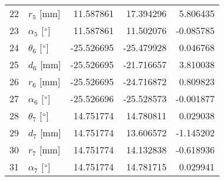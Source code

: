 \documentclass{standalone}%
\begin{document}
\begin{tabular}{llrrr}
22 &              $r_{5}$ [mm] &  11.587861 &  17.394296 &   5.806435 \\
23 &  $\alpha_{5}$ [$\degree$] &  11.587861 &  11.502076 &  -0.085785 \\
24 &  $\theta_{6}$ [$\degree$] & -25.526695 & -25.479928 &   0.046768 \\
25 &              $d_{6}$ [mm] & -25.526695 & -21.716657 &   3.810038 \\
26 &              $r_{6}$ [mm] & -25.526695 & -24.716872 &   0.809823 \\
27 &  $\alpha_{6}$ [$\degree$] & -25.526696 & -25.528573 &  -0.001877 \\
28 &  $\theta_{7}$ [$\degree$] &  14.751774 &  14.780811 &   0.029038 \\
29 &              $d_{7}$ [mm] &  14.751774 &  13.606572 &  -1.145202 \\
30 &              $r_{7}$ [mm] &  14.751774 &  14.132838 &  -0.618936 \\
31 &  $\alpha_{7}$ [$\degree$] &  14.751774 &  14.781715 &   0.029941 \\
\bottomrule
\end{tabular}
%
\end{document}
